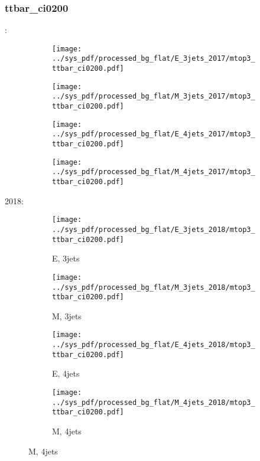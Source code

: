 \documentclass{beamer}
\begin{document}
\begin{frame}
\frametitle{ttbar_ci0200}
\fontsize{5}{1}:
\begin{figure}
\centering
\begin{subfigure}[b]{0.24\textwidth}
\texttt{[image: ../sys\_pdf/processed\_bg\_flat/E\_3jets\_2017/mtop3\_ttbar\_ci0200.pdf]}
\end{subfigure}
\begin{subfigure}[b]{0.24\textwidth}
\texttt{[image: ../sys\_pdf/processed\_bg\_flat/M\_3jets\_2017/mtop3\_ttbar\_ci0200.pdf]}
\end{subfigure}
\begin{subfigure}[b]{0.24\textwidth}
\texttt{[image: ../sys\_pdf/processed\_bg\_flat/E\_4jets\_2017/mtop3\_ttbar\_ci0200.pdf]}
\end{subfigure}
\begin{subfigure}[b]{0.24\textwidth}
\texttt{[image: ../sys\_pdf/processed\_bg\_flat/M\_4jets\_2017/mtop3\_ttbar\_ci0200.pdf]}
\end{subfigure}
\end{figure}
2018:
\begin{figure}
\centering
\begin{subfigure}[b]{0.24\textwidth}
\texttt{[image: ../sys\_pdf/processed\_bg\_flat/E\_3jets\_2018/mtop3\_ttbar\_ci0200.pdf]}
\captionsetup{font=tiny}
\caption{E, 3jets}
\end{subfigure}
\begin{subfigure}[b]{0.24\textwidth}
\texttt{[image: ../sys\_pdf/processed\_bg\_flat/M\_3jets\_2018/mtop3\_ttbar\_ci0200.pdf]}
\captionsetup{font=tiny}
\caption{M, 3jets}
\end{subfigure}
\begin{subfigure}[b]{0.24\textwidth}
\texttt{[image: ../sys\_pdf/processed\_bg\_flat/E\_4jets\_2018/mtop3\_ttbar\_ci0200.pdf]}
\captionsetup{font=tiny}
\caption{E, 4jets}
\end{subfigure}
\begin{subfigure}[b]{0.24\textwidth}
\texttt{[image: ../sys\_pdf/processed\_bg\_flat/M\_4jets\_2018/mtop3\_ttbar\_ci0200.pdf]}
\captionsetup{font=tiny}
\caption{M, 4jets}
\end{subfigure}
\end{figure}
\end{frame}
\end{document}
